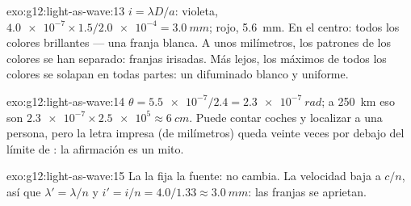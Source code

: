 \begin{solution}{exo:g12:light-as-wave:13}
$i = \lambda D/a$: violeta,
$\num{4.0e-7} \times 1.5/\num{2.0e-4} = \qty{3.0}{mm}$; rojo,
\qty{5.6}{mm}. En el centro: todos los colores brillantes --- una franja
blanca. A unos milímetros, los patrones de los colores se han separado:
franjas irisadas. Más lejos, los máximos de todos los colores se solapan
en todas partes: un difuminado blanco y uniforme.
\end{solution}

\begin{solution}{exo:g12:light-as-wave:14}
$\theta = \num{5.5e-7}/2.4 = \qty{2.3e-7}{rad}$; a \qty{250}{km} eso son
$\num{2.3e-7} \times \num{2.5e5} \approx \qty{6}{cm}$. Puede contar
coches y localizar a una persona, pero la letra impresa (de milímetros)
queda veinte veces por debajo del límite de : la afirmación es
un mito.
\end{solution}

\begin{solution}{exo:g12:light-as-wave:15}
La  la fija la fuente: no cambia. La velocidad baja a $c/n$,
así que $\lambda' = \lambda/n$ y
$i' = i/n = 4.0/1.33 \approx \qty{3.0}{mm}$: las franjas se aprietan.
\end{solution}

